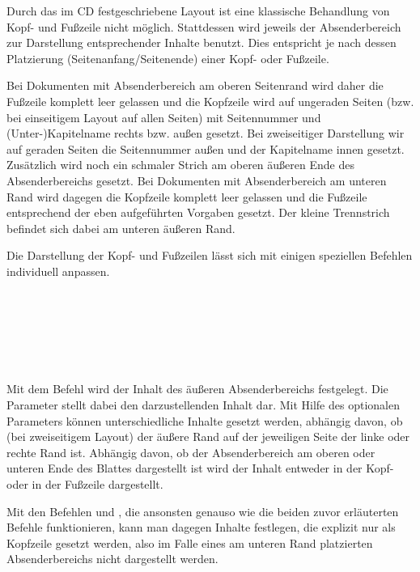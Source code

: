 Durch das im \acs{CD} festgeschriebene Layout ist eine klassische Behandlung von
Kopf- und Fußzeile nicht möglich.
Stattdessen wird jeweils der Absenderbereich zur Darstellung entsprechender
Inhalte benutzt. Dies entspricht je nach dessen Platzierung
(Seitenanfang/Seitenende) einer Kopf- oder Fußzeile.

Bei Dokumenten mit Absenderbereich am oberen Seitenrand wird daher die Fußzeile
komplett leer gelassen und die Kopfzeile wird auf ungeraden Seiten
(bzw. bei einseitigem Layout auf allen Seiten)
mit Seitennummer und (Unter-)Kapitelname rechts bzw. außen gesetzt.
Bei zweiseitiger Darstellung wir auf geraden Seiten die Seitennummer außen und
der Kapitelname innen gesetzt.
Zusätzlich wird noch ein schmaler Strich am oberen äußeren Ende des
Absenderbereichs gesetzt.
Bei Dokumenten mit Absenderbereich am unteren Rand wird dagegen die Kopfzeile
komplett leer gelassen und die Fußzeile entsprechend der eben aufgeführten
Vorgaben gesetzt. Der kleine Trennstrich befindet sich dabei am unteren
äußeren Rand.

Die Darstellung der Kopf- und Fußzeilen lässt sich mit einigen
speziellen Befehlen individuell anpassen.

\begin{Declaration}
  \\
  \\
  \\
  \\
  \\
\end{Declaration}

Mit dem Befehl 
wird der Inhalt des äußeren Absenderbereichs festgelegt.
Die Parameter  stellt dabei den darzustellenden Inhalt dar.
Mit Hilfe des optionalen Parameters  können unterschiedliche
Inhalte gesetzt werden, abhängig davon, ob (bei zweiseitigem Layout)
der äußere Rand auf der jeweiligen Seite der linke oder rechte Rand ist.
Abhängig davon, ob der Absenderbereich am oberen oder unteren Ende des Blattes
dargestellt ist wird der Inhalt entweder in der Kopf- oder in der Fußzeile
dargestellt.

Mit den Befehlen  und , die ansonsten genauso
wie die beiden zuvor erläuterten Befehle funktionieren, kann man dagegen
Inhalte festlegen, die explizit nur als Kopfzeile gesetzt werden, also
im Falle eines am unteren Rand platzierten Absenderbereichs nicht dargestellt 
werden.

